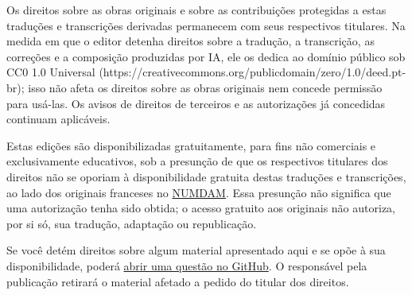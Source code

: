 \documentclass[11pt,twoside,openany]{book}
\newcommand{\FgaUnitKey}{frontmatter}
\begin{document}
Os direitos sobre as obras originais e sobre as contribuições protegidas a estas traduções e transcrições derivadas permanecem com seus respectivos titulares. Na medida em que o editor detenha direitos sobre a tradução, a transcrição, as correções e a composição produzidas por IA, ele os dedica ao domínio público sob CC0 1.0 Universal (https://creativecommons.org/publicdomain/zero/1.0/deed.pt-br); isso não afeta os direitos sobre as obras originais nem concede permissão para usá-las. Os avisos de direitos de terceiros e as autorizações já concedidas continuam aplicáveis.

Estas edições são disponibilizadas gratuitamente, para fins não comerciais e exclusivamente educativos, sob a presunção de que os respectivos titulares dos direitos não se oporiam à disponibilidade gratuita destas traduções e transcrições, ao lado dos originais franceses no \href{https://www.numdam.org/}{NUMDAM}. Essa presunção não significa que uma autorização tenha sido obtida; o acesso gratuito aos originais não autoriza, por si só, sua tradução, adaptação ou republicação.

Se você detém direitos sobre algum material apresentado aqui e se opõe à sua disponibilidade, poderá \href{https://github.com/KokunoYumeto/ega-fga-sga-pt-br/issues}{abrir uma questão no GitHub}. O responsável pela publicação retirará o material afetado a pedido do titular dos direitos.


\tableofcontents
\mainmatter
\def\FgaUnitKey{149}
\def\FgaUnitKey{e149}
\def\FgaUnitKey{182}
\def\FgaUnitKey{e182}
\def\FgaUnitKey{190}
\def\FgaUnitKey{e190}
\def\FgaUnitKey{195}
\def\FgaUnitKey{e195}
\def\FgaUnitKey{212}
\def\FgaUnitKey{e212}
\def\FgaUnitKey{221}
\def\FgaUnitKey{e221}
\def\FgaUnitKey{232}
\def\FgaUnitKey{e232}
\def\FgaUnitKey{236}
\def\FgaUnitKey{e236}
\def\FgaUnitKey{com}
\end{document}
